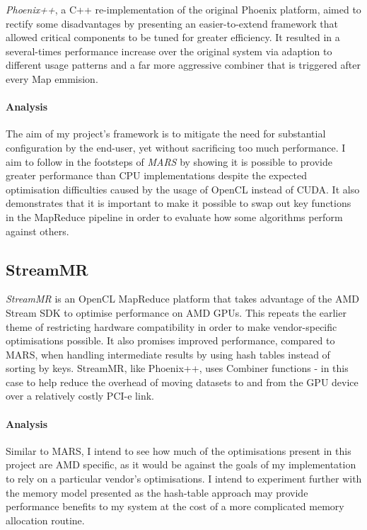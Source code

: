 \emph{Phoenix++}\cite{phoenix++}, a C++ re-implementation of the original Phoenix platform, aimed to rectify some disadvantages by presenting an easier-to-extend framework that allowed critical components to be tuned for greater efficiency. It resulted in a several-times performance increase over the original system via adaption to different usage patterns and a far more aggressive combiner that is triggered after every Map emmision.

\paragraph{Analysis}
The aim of my project's framework is to mitigate the need for substantial configuration by the end-user, yet without sacrificing too much performance. I aim to follow in the footsteps of \emph{MARS} by showing it is possible to provide greater performance than CPU implementations despite the expected optimisation difficulties caused by the usage of OpenCL instead of CUDA.
It also demonstrates that it is important to make it possible to swap out key functions in the MapReduce pipeline in order to evaluate how some algorithms perform against others.

\subsection{StreamMR}
\emph{StreamMR}\cite{streammr} is an OpenCL MapReduce platform that takes advantage of the AMD Stream SDK to optimise performance on AMD \ac{GPUs}. This repeats the earlier theme of restricting hardware compatibility in order to make vendor-specific optimisations possible. It also promises improved performance, compared to MARS, when handling intermediate results by using hash tables instead of sorting by keys. StreamMR, like Phoenix++, uses Combiner functions - in this case to help reduce the overhead of moving datasets to and from the GPU device over a relatively costly PCI-e link.

\paragraph{Analysis}
Similar to MARS, I intend to see how much of the optimisations present in this project are AMD specific, as it would be against the goals of my implementation to rely on a particular vendor's optimisations. I intend to experiment further with the memory model presented as the hash-table approach may provide performance benefits to my system at the cost of a more complicated memory allocation routine.
